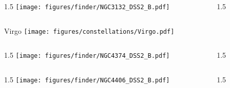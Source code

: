 \documentclass[final]{beamer}
\newlength{\colwidth}
\begin{document}

\begin{frame}[t]{}
    \begin{columns}[T]
        \begin{column}{1.5\colwidth}
            \centering
            \texttt{[image: figures/finder/NGC3132\_DSS2\_B.pdf]}
        \end{column}
        \begin{column}{1.5\colwidth}
            \Large
            
        \end{column}
    \end{columns}
    \vspace{\fill}
\end{frame}


\begin{frame}[t]{\LARGE Virgo}
    \centering
    \texttt{[image: figures/constellations/Virgo.pdf]}
\end{frame}


\begin{frame}[t]{}
    \begin{columns}[T]
        \begin{column}{1.5\colwidth}
            \centering
            \texttt{[image: figures/finder/NGC4374\_DSS2\_B.pdf]}
        \end{column}
        \begin{column}{1.5\colwidth}
            \Large
            
        \end{column}
    \end{columns}
    \vspace{\fill}
    \begin{columns}[T]
        \begin{column}{1.5\colwidth}
            \centering
            \texttt{[image: figures/finder/NGC4406\_DSS2\_B.pdf]}
        \end{column}
        \begin{column}{1.5\colwidth}
            \Large
            
        \end{column}
    \end{columns}
\end{frame}
\end{document}
